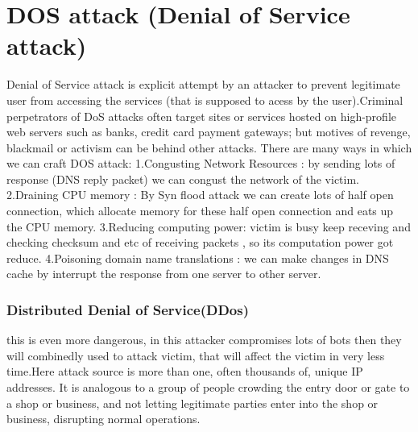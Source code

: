 \documentclass[11pt]{article}
\begin{document}
\section{DOS attack (Denial of Service attack)}
Denial of Service attack is explicit attempt by an attacker to prevent legitimate user from accessing the services (that is supposed to acess by the user).Criminal perpetrators of DoS attacks often target sites or services hosted on high-profile web servers such as banks, credit card payment gateways; but motives of revenge, blackmail or activism can be behind other attacks.
There are many ways in which we can craft DOS attack:
1.Congusting Network Resources : by sending lots of response (DNS reply packet) we can congust the network of the victim.
2.Draining CPU memory : By Syn flood attack we can create lots of half open connection, which allocate memory for these half open connection and eats up the CPU memory.
3.Reducing computing power: victim is busy keep receving and checking checksum and etc of receiving packets , so its computation power got reduce.
4.Poisoning domain name translations : we can make changes in DNS cache by interrupt the response from one server to other server.

\subsubsection{Distributed Denial of Service(DDos)}
this is even more dangerous, in this attacker compromises lots of bots then they will combinedly used to attack victim, that will affect the victim in very less time.Here attack source is more than one, often thousands of, unique IP addresses. It is analogous to a group of people crowding the entry door or gate to a shop or business, and not letting legitimate parties enter into the shop or business, disrupting normal operations.
\end{document}
